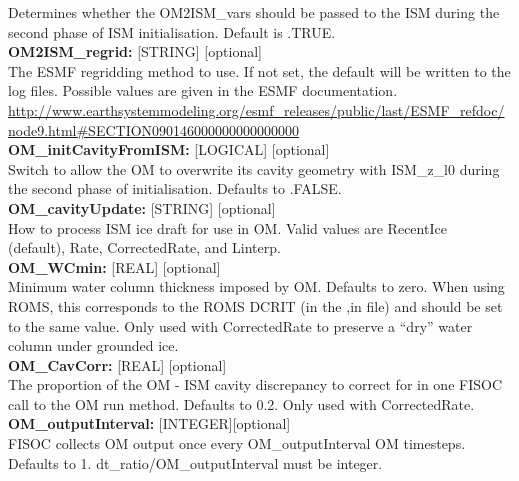 \documentclass[11pt]{article}
\begin{document}
\begin{flushleft}
Determines whether the OM2ISM\_vars should be passed to the ISM during the 
second phase of ISM initialisation.   Default is .TRUE.                    \\ 
\vspace{6pt}
\textbf{OM2ISM\_regrid:}       [STRING] [optional]                         \\
The ESMF regridding method to use.  If not set, the default will be 
written to the log files.  Possible values are given in the ESMF 
documentation. 
\url{http://www.earthsystemmodeling.org/esmf_releases/public/last/ESMF_refdoc/node9.html#SECTION090146000000000000000}                                        \\
\vspace{6pt}
\textbf{OM\_initCavityFromISM:}  [LOGICAL] [optional]                      \\
Switch to allow the OM to overwrite its cavity geometry with ISM\_z\_l0 
during the second phase of initialisation.
Defaults to .FALSE.                                                        \\
\vspace{6pt}
\textbf{OM\_cavityUpdate:}   [STRING] [optional]                           \\
How to process ISM ice draft for use in OM.  Valid values are RecentIce    \\
(default), Rate, CorrectedRate, and Linterp.                               \\
\vspace{6pt}
\textbf{OM\_WCmin:}  [REAL] [optional]                                     \\
Minimum water column thickness imposed by OM.  Defaults to zero.  When 
using ROMS, this corresponds to the ROMS DCRIT (in the ,in file) and 
should be set to the same value.  Only used with CorrectedRate to 
preserve a ``dry'' water column under grounded ice.                        \\
\vspace{6pt}
\textbf{OM\_CavCorr:}  [REAL] [optional]                                   \\
The proportion of the OM - ISM cavity discrepancy to correct for in one 
FISOC call to the  OM run method.  Defaults to 0.2.  Only used with 
CorrectedRate.                                                             \\
\vspace{6pt}
\textbf{OM\_outputInterval:} [INTEGER][optional]                           \\
FISOC collects OM output once every OM\_outputInterval OM timesteps. 
Defaults to 1.  dt\_ratio/OM\_outputInterval must be integer.              \\
\vspace{22pt}



\end{flushleft}
\end{document}
